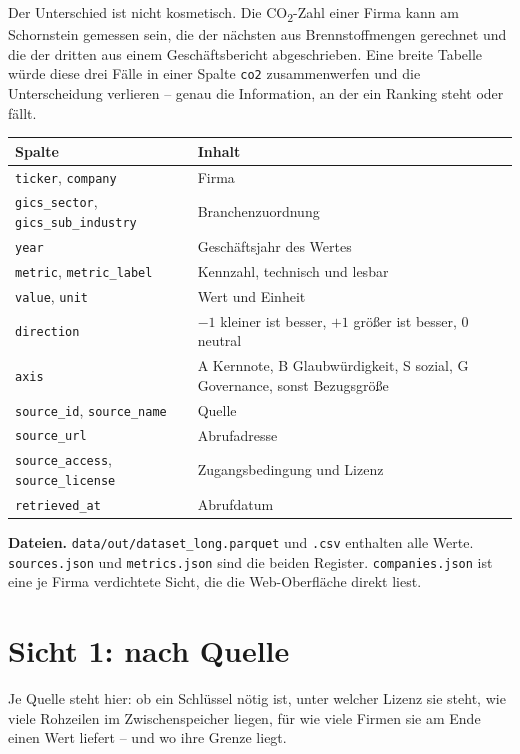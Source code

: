 \documentclass[11pt,a4paper]{article}
\begin{document}
Der Unterschied ist nicht kosmetisch. Die CO\textsubscript{2}-Zahl einer Firma kann am Schornstein gemessen sein, die der nächsten aus Brennstoffmengen gerechnet und die der dritten aus einem Geschäftsbericht abgeschrieben. Eine breite Tabelle würde diese drei Fälle in einer Spalte \texttt{co2} zusammenwerfen und die Unterscheidung verlieren -- genau die Information, an der ein Ranking steht oder fällt.

\begin{center}\small
\begin{tabular}{lP{10.6cm}}
\toprule
\textbf{Spalte} & \textbf{Inhalt} \\
\midrule
\texttt{ticker}, \texttt{company} & Firma \\
\texttt{gics\_sector}, \texttt{gics\_sub\_industry} & Branchenzuordnung \\
\texttt{year} & Geschäftsjahr des Wertes \\
\texttt{metric}, \texttt{metric\_label} & Kennzahl, technisch und lesbar \\
\texttt{value}, \texttt{unit} & Wert und Einheit \\
\texttt{direction} & $-1$ kleiner ist besser, $+1$ größer ist besser, $0$ neutral \\
\texttt{axis} & A Kernnote, B Glaubwürdigkeit, S sozial, G Governance, sonst Bezugsgröße \\
\texttt{source\_id}, \texttt{source\_name} & Quelle \\
\texttt{source\_url} & Abrufadresse \\
\texttt{source\_access}, \texttt{source\_license} & Zugangsbedingung und Lizenz \\
\texttt{retrieved\_at} & Abrufdatum \\
\bottomrule
\end{tabular}
\end{center}

\textbf{Dateien.} \texttt{data/out/dataset\_long.parquet} und \texttt{.csv} enthalten alle Werte. \texttt{sources.json} und \texttt{metrics.json} sind die beiden Register. \texttt{companies.json} ist eine je Firma verdichtete Sicht, die die Web-Oberfläche direkt liest.

\newpage
\section{Sicht 1: nach Quelle}

Je Quelle steht hier: ob ein Schlüssel nötig ist, unter welcher Lizenz sie steht, wie viele Rohzeilen im Zwischenspeicher liegen, für wie viele Firmen sie am Ende einen Wert liefert -- und wo ihre Grenze liegt.
\end{document}

